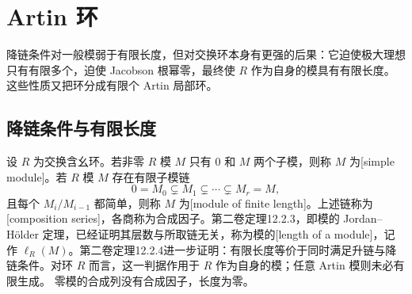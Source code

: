 
\section{Artin 环}
\label{b3:sec:0303}

降链条件对一般模弱于有限长度，但对交换环本身有更强的后果：它迫使极大理想只有有限多个，迫使 Jacobson 根幂零，最终使 \(R\) 作为自身的模具有有限长度。这些性质又把环分成有限个 Artin 局部环。

\subsection{降链条件与有限长度}
\label{b3:subsec:0303:01}

设 \(R\) 为交换含幺环。若非零 \(R\) 模 \(M\) 只有 \(0\) 和 \(M\) 两个子模，则称 \(M\) 为[simple module]。若 \(R\) 模 \(M\) 存在有限子模链
\[
	0=M_0\subsetneq M_1\subsetneq\cdots\subsetneq M_r=M,
\]
且每个 \(M_i/M_{i-1}\) 都简单，则称 \(M\) 为[module of finite length]。上述链称为[composition series]，各商称为合成因子。第二卷定理12.2.3，即模的 Jordan–Hölder 定理，已经证明其层数与所取链无关，称为模的[length of a module]，记作 \(\ell_R(M)\)。第二卷定理12.2.4进一步证明：有限长度等价于同时满足升链与降链条件。对环 \(R\) 而言，这一判据作用于 \(R\) 作为自身的模；任意 Artin 模则未必有限生成。 零模的合成列没有合成因子，长度为零。

